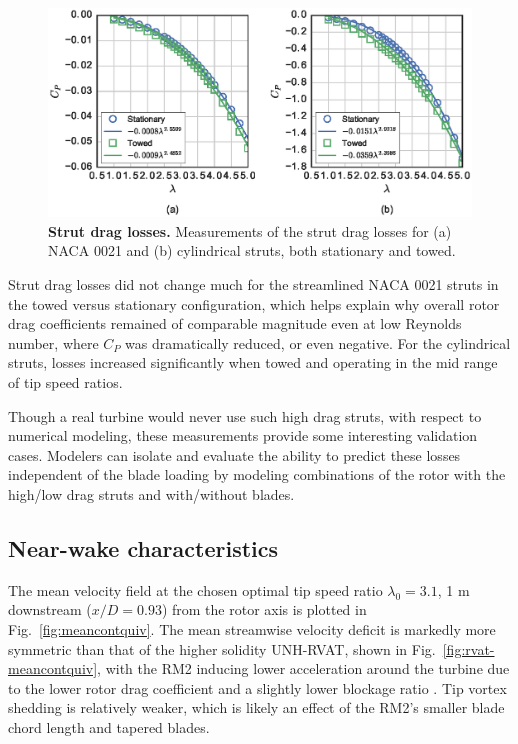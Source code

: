 \documentclass[10pt,letterpaper]{article}
\begin{document}
\begin{figure}
    \includegraphics[width=\textwidth]{figures/no_blades_all.eps}

    \caption{{\bf Strut drag losses.} Measurements of the strut drag losses for
        (a) NACA 0021 and (b) cylindrical struts, both stationary and towed.}

    \label{fig:no-blades}
\end{figure}

Strut drag losses did not change much for the streamlined NACA 0021 struts in
the towed versus stationary configuration, which helps explain why overall rotor
drag coefficients remained of comparable magnitude even at low Reynolds number,
where $C_P$ was dramatically reduced, or even negative. For the cylindrical
struts, losses increased significantly when towed and operating in the mid range
of tip speed ratios.

Though a real turbine would never use such high drag struts, with respect to
numerical modeling, these measurements provide some interesting validation
cases. Modelers can isolate and evaluate the ability to predict these losses
independent of the blade loading by modeling combinations of the rotor with the
high/low drag struts and with/without blades.


\subsection*{Near-wake characteristics}

The mean velocity field at the chosen optimal tip speed ratio $\lambda_0=3.1$, 1
m downstream ($x/D=0.93$) from the rotor axis is plotted in
Fig.~\ref{fig:meancontquiv}. The mean streamwise velocity deficit is markedly
more symmetric than that of the higher solidity UNH-RVAT, shown in
Fig.~\ref{fig:rvat-meancontquiv}, with the RM2 inducing lower acceleration
around the turbine due to the lower rotor drag coefficient and a slightly lower
blockage ratio \cite{Bachant2015-JoT}. Tip vortex shedding is relatively weaker,
which is likely an effect of the RM2's smaller blade chord length and tapered
blades.
\end{document}
